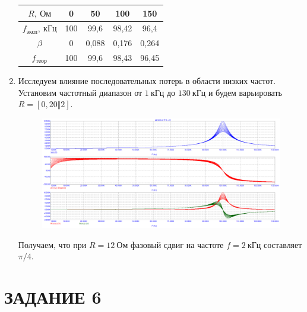 \documentclass[a4paper, 12pt]{article}%
\begin{document}
\begin{enumerate}
\begin{center}
\begin{tabular}{|c|c|c|c|c|}
\hline 
$R, \: \textit{Ом}$ & 0 & 50 & 100 & 150 \\ 
\hline 
$f_{\textit{эксп}}, \: \textit{кГц}$ & 100 & 99,6 & 98,42 & 96,4 \\ 
\hline 
$\beta$ & 0 & 0,088 & 0,176 & 0,264 \\ 
\hline 
$f_{\textit{теор}}$ & 100 & 99,6 & 98,43 & 96,45 \\ 
\hline 
\end{tabular} 
\end{center}

\item Исследуем влияние последовательных потерь в области низких частот. Установим частотный диапазон от $1 \: \textit{кГц}$ до $130 \: \textit{кГц}$ и будем варьировать $R = [0,20 \Vert 2]$.

\begin{figure}[h!]
\centering
\includegraphics[scale=0.4]{parallel_AC3.png}
\label{fig:Image1}
\end{figure} 

Получаем, что при $R = 12 \: \textit{Ом}$ фазовый сдвиг на частоте $f = 2 \: \textit{кГц}$ составляет $\pi / 4$. 

\end{enumerate}

\section*{ЗАДАНИЕ 6}
\end{document}
